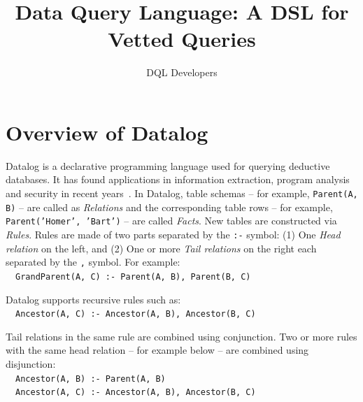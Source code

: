 \documentclass{acm_proc_article-sp}
\newcommand{\dsl}{DQL}
\begin{document}
\title{Data Query Language: A DSL for Vetted Queries} 
\author{DQL Developers}
\maketitle






%



%



\appendix

\section{Overview of Datalog}
\label{datalog-intro}
\label{Datalog} 
Datalog is a declarative programming language 
used for querying deductive databases.
It has found applications in information extraction, program analysis and security in recent years~\cite{Huang:2011:DEA:1989323.1989456,datalog,Ramakrishnan93asurvey}.
In Datalog, table schemas -- for example, \texttt{\small Parent(A, B)} -- are called as {\em Relations} and the corresponding table rows -- for example, \texttt{\small Parent('Homer', 'Bart')} -- are called {\em Facts}. 
New tables are constructed via {\em Rules}. Rules are made of two parts separated by the \texttt{:-} symbol: (1) One {\em Head relation} on the left, and (2) One or more {\em Tail relations} on the right each separated by the \texttt{,} symbol. For example:\\
		{\small\phantom{.}~~\texttt{GrandParent(A, C) :- Parent(A, B), Parent(B, C)} }
	
	Datalog supports recursive rules such as: \\
		{\small\phantom{.}~~\texttt{Ancestor(A, C) :- Ancestor(A, B), Ancestor(B, C)}}
	
	Tail relations in the same rule are combined using conjunction. Two or more rules with the same head relation -- for example below -- are combined using disjunction:\\
{\small\phantom{.}~~\texttt{Ancestor(A, B) :- Parent(A, B)}\\
\phantom{.}~~\texttt{Ancestor(A, C) :- Ancestor(A, B), Ancestor(B, C)}}
	
\end{document}
